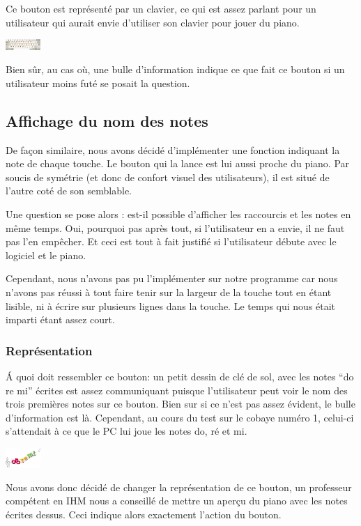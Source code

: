 \documentclass{article}
\begin{document}
Ce bouton est représenté par un clavier, ce qui est assez parlant pour un utilisateur qui aurait envie d'utiliser son clavier 
pour jouer du piano.
\begin{center}
\includegraphics[width = 50px]{./images/clavier.png}
\end{center}


Bien sûr, au cas où, une bulle d'information indique ce que fait ce bouton si un utilisateur moins futé se posait la question.

\subsection{Affichage du nom des notes}
De façon similaire, nous avons décidé d'implémenter une fonction indiquant la note de chaque touche. Le bouton qui la lance est lui 
aussi proche du piano. Par soucis de symétrie (et donc de confort visuel des utilisateurs), il est situé de l'autre coté de son semblable.

Une question se pose alors : est-il possible d'afficher les raccourcis et les notes en même temps.
Oui, pourquoi pas après tout, si l'utilisateur en a envie, il ne faut pas l'en empêcher. Et ceci est tout à fait justifié si 
l'utilisateur débute avec le logiciel et le piano.


Cependant, nous n'avons pas pu l'implémenter sur notre programme car nous n'avons pas réussi à tout faire tenir sur la largeur de la touche
tout en étant lisible, ni à écrire sur plusieurs lignes dans la touche. Le temps qui nous était imparti étant assez court.

\subsubsection{Représentation}
\'A quoi doit ressembler ce bouton: un petit dessin de clé de sol, avec les notes ``do re mi'' écrites est assez communiquant puisque
l'utilisateur peut voir le nom des trois premières notes sur ce bouton. Bien sur si ce n'est pas assez évident, le bulle d'information
est là. Cependant, au cours du test sur le cobaye numéro 1, celui-ci s'attendait à ce que le PC lui joue les notes do, ré et mi.
\begin{center}
\includegraphics[width = 50px]{./images/doremi.png}
\end{center}
Nous avons donc décidé de changer la représentation de ce bouton, un professeur compétent en IHM nous a conseillé de mettre
 un aperçu du piano avec les notes écrites dessus. Ceci indique alors exactement l'action du bouton.
 
\end{document}
